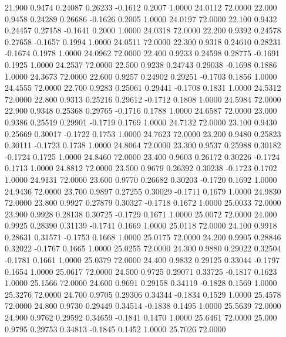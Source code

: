   21.900   0.9474   0.24087   0.26233  -0.1612   0.2007   1.0000  24.0112  72.0000
  22.000   0.9458   0.24289   0.26686  -0.1626   0.2005   1.0000  24.0197  72.0000
  22.100   0.9432   0.24457   0.27158  -0.1641   0.2000   1.0000  24.0318  72.0000
  22.200   0.9392   0.24578   0.27658  -0.1657   0.1994   1.0000  24.0511  72.0000
  22.300   0.9318   0.24610   0.28231  -0.1674   0.1978   1.0000  24.0962  72.0000
  22.400   0.9233   0.24598   0.28775  -0.1691   0.1925   1.0000  24.2537  72.0000
  22.500   0.9238   0.24743   0.29038  -0.1698   0.1886   1.0000  24.3673  72.0000
  22.600   0.9257   0.24902   0.29251  -0.1703   0.1856   1.0000  24.4555  72.0000
  22.700   0.9283   0.25061   0.29441  -0.1708   0.1831   1.0000  24.5312  72.0000
  22.800   0.9313   0.25216   0.29612  -0.1712   0.1808   1.0000  24.5984  72.0000
  22.900   0.9348   0.25368   0.29765  -0.1716   0.1788   1.0000  24.6587  72.0000
  23.000   0.9386   0.25519   0.29901  -0.1719   0.1769   1.0000  24.7132  72.0000
  23.100   0.9430   0.25669   0.30017  -0.1722   0.1753   1.0000  24.7623  72.0000
  23.200   0.9480   0.25823   0.30111  -0.1723   0.1738   1.0000  24.8064  72.0000
  23.300   0.9537   0.25988   0.30182  -0.1724   0.1725   1.0000  24.8460  72.0000
  23.400   0.9603   0.26172   0.30226  -0.1724   0.1713   1.0000  24.8812  72.0000
  23.500   0.9679   0.26392   0.30238  -0.1723   0.1702   1.0000  24.9131  72.0000
  23.600   0.9770   0.26682   0.30203  -0.1720   0.1692   1.0000  24.9436  72.0000
  23.700   0.9897   0.27255   0.30029  -0.1711   0.1679   1.0000  24.9830  72.0000
  23.800   0.9927   0.27879   0.30327  -0.1718   0.1672   1.0000  25.0033  72.0000
  23.900   0.9928   0.28138   0.30725  -0.1729   0.1671   1.0000  25.0072  72.0000
  24.000   0.9925   0.28390   0.31139  -0.1741   0.1669   1.0000  25.0118  72.0000
  24.100   0.9918   0.28631   0.31571  -0.1753   0.1668   1.0000  25.0175  72.0000
  24.200   0.9905   0.28846   0.32022  -0.1767   0.1665   1.0000  25.0255  72.0000
  24.300   0.9880   0.29022   0.32504  -0.1781   0.1661   1.0000  25.0379  72.0000
  24.400   0.9832   0.29125   0.33044  -0.1797   0.1654   1.0000  25.0617  72.0000
  24.500   0.9725   0.29071   0.33725  -0.1817   0.1623   1.0000  25.1566  72.0000
  24.600   0.9691   0.29158   0.34119  -0.1828   0.1569   1.0000  25.3276  72.0000
  24.700   0.9705   0.29306   0.34344  -0.1834   0.1529   1.0000  25.4578  72.0000
  24.800   0.9730   0.29449   0.34514  -0.1838   0.1495   1.0000  25.5639  72.0000
  24.900   0.9762   0.29592   0.34659  -0.1841   0.1470   1.0000  25.6461  72.0000
  25.000   0.9795   0.29753   0.34813  -0.1845   0.1452   1.0000  25.7026  72.0000
